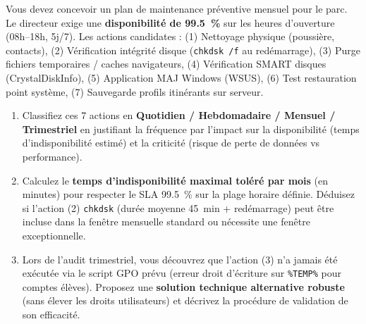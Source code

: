 \documentclass[11pt]{article}
\begin{document}
\begin{exercice}
Vous devez concevoir un plan de maintenance préventive mensuel pour le parc. Le directeur exige une \textbf{disponibilité de \SI{99,5}{\%}} sur les heures d'ouverture (08h--18h, 5j/7). Les actions candidates : (1) Nettoyage physique (poussière, contacts), (2) Vérification intégrité disque (\texttt{chkdsk /f} au redémarrage), (3) Purge fichiers temporaires / caches navigateurs, (4) Vérification SMART disques (CrystalDiskInfo), (5) Application MAJ Windows (WSUS), (6) Test restauration point système, (7) Sauvegarde profils itinérants sur serveur.
\begin{enumerate}
    \item Classifiez ces \num{7} actions en \textbf{Quotidien / Hebdomadaire / Mensuel / Trimestriel} en justifiant la fréquence par l'impact sur la disponibilité (temps d'indisponibilité estimé) et la criticité (risque de perte de données vs performance).
    \item Calculez le \textbf{temps d'indisponibilité maximal toléré par mois} (en minutes) pour respecter le SLA \SI{99,5}{\%} sur la plage horaire définie. Déduisez si l'action (2) \texttt{chkdsk} (durée moyenne \SI{45}{min} + redémarrage) peut être incluse dans la fenêtre mensuelle standard ou nécessite une fenêtre exceptionnelle.
    \item Lors de l'audit trimestriel, vous découvrez que l'action (3) n'a jamais été exécutée via le script GPO prévu (erreur droit d'écriture sur \texttt{\%TEMP\%} pour comptes élèves). Proposez une \textbf{solution technique alternative robuste} (sans élever les droits utilisateurs) et décrivez la procédure de validation de son efficacité.
\end{enumerate}
\end{exercice}
\end{document}
